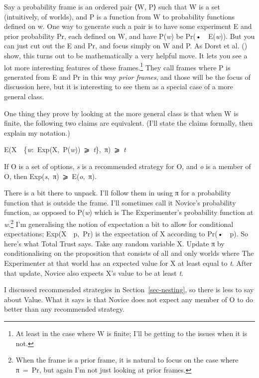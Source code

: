\documentclass[
  12pt,
  letterpaper,
  DIV=11,
  numbers=noendperiod]{scrartcl}
\providecommand{\tightlist}{%
  \setlength{\itemsep}{0pt}\setlength{\parskip}{0pt}}\usepackage{longtable,booktabs,array}
\begin{document}
Say a probability frame is an ordered pair ⟨W, P⟩ such that W is a set
(intuitively, of worlds), and P is a function from W to probability
functions defined on w. One way to generate such a pair is to have some
experiment E and prior probability Pr, each defined on W, and have
P(\emph{w}) be Pr(•~\textbar~E(\emph{w})). But you can just cut out the
E and Pr, and focus simply on W and P. As Dorst et al.
() show, this turns out to be
mathematically a very helpful move. It lets you see a lot more
interesting features of these frames.\footnote{At least in the case
  where W is finite; I'll be getting to the issues when it is not.} They
call frames where P is generated from E and Pr in this way \emph{prior
frames}, and those will be the focus of discussion here, but it is
interesting to see them as a special case of a more general class.

One thing they prove by looking at the more general class is that when W
is finite, the following two claims are equivalent. (I'll state the
claims formally, then explain my notation.)

\begin{description}
\tightlist
\item[Total Trust]
E(X~\textbar~\{\emph{w}:~Exp(X,~P(\emph{w}))~⩾~\emph{t}\},~π)~⩾~\emph{t}
\item[Value]
If O is a set of options, \emph{s} is a recommended strategy for O, and
\emph{o} is a member of O, then Exp(\emph{s},~π)~⩾~E(\emph{o},~π).
\end{description}

There is a bit there to unpack. I'll follow them in using π for a
probability function that is outside the frame. I'll sometimes call it
Novice's probability function, as opposed to P(\emph{w}) which is The
Experimenter's probability function at \emph{w}.\footnote{When the frame
  is a prior frame, it is natural to focus on the case where π~=~Pr, but
  again I'm not just looking at prior frames.} I'm generalising the
notion of expectation a bit to allow for conditional expectations;
Exp(X~\textbar~p,~Pr) is the expectation of X according to
Pr(•~\textbar~p). So here's what Total Trust says. Take any random
variable X. Update π by conditionalising on the proposition that
consists of all and only worlds where The Experimenter at that world has
an expected value for X at least equal to \emph{t}. After that update,
Novice also expects X's value to be at least \emph{t}.

I discussed recommended strategies in Section~\ref{sec-nesting}, so
there is less to say about Value. What it says is that Novice does not
expect any member of O to do better than any recommended strategy.
\end{document}
